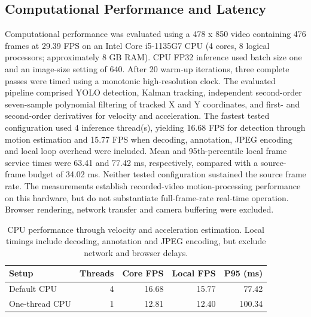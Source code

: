\subsection{Computational Performance and Latency}
Computational performance was evaluated using a 478 x 850 video containing 476 frames at 29.39 FPS on an Intel Core i5-1135G7 CPU (4 cores, 8 logical processors; approximately 8 GB RAM). CPU FP32 inference used batch size one and an image-size setting of 640. After 20 warm-up iterations, three complete passes were timed using a monotonic high-resolution clock. The evaluated pipeline comprised YOLO detection, Kalman tracking, independent second-order seven-sample polynomial filtering of tracked X and Y coordinates, and first- and second-order derivatives for velocity and acceleration. The fastest tested configuration used 4 inference thread(s), yielding 16.68 FPS for detection through motion estimation and 15.77 FPS when decoding, annotation, JPEG encoding and local loop overhead were included. Mean and 95th-percentile local frame service times were 63.41 and 77.42 ms, respectively, compared with a source-frame budget of 34.02 ms. Neither tested configuration sustained the source frame rate. The measurements establish recorded-video motion-processing performance on this hardware, but do not substantiate full-frame-rate real-time operation. Browser rendering, network transfer and camera buffering were excluded.

\begin{table}[t]
\centering
\caption{CPU performance through velocity and acceleration estimation. Local timings include decoding, annotation and JPEG encoding, but exclude network and browser delays.}
\label{tab:runtime}
\begin{tabular}{lrrrr}
\hline
Setup & Threads & Core FPS & Local FPS & P95 (ms) \\
\hline
Default CPU & 4 & 16.68 & 15.77 & 77.42 \\
One-thread CPU & 1 & 12.81 & 12.40 & 100.34 \\
\hline
\end{tabular}
\end{table}

